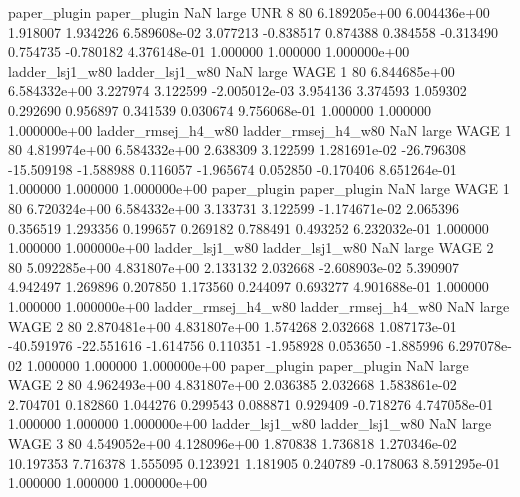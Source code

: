        paper_plugin        paper_plugin                   NaN      large      UNR                 8 80 6.189205e+00   6.004436e+00      1.918007       1.934226  6.589608e-02      3.077213     -0.838517     0.874388       0.384558 -0.313490   0.754735    -0.780182   4.376148e-01            1.000000        1.000000        1.000000e+00
    ladder_lsj1_w80     ladder_lsj1_w80                   NaN      large     WAGE                 1 80 6.844685e+00   6.584332e+00      3.227974       3.122599 -2.005012e-03      3.954136      3.374593     1.059302       0.292690  0.956897   0.341539     0.030674   9.756068e-01            1.000000        1.000000        1.000000e+00
ladder_rmsej_h4_w80 ladder_rmsej_h4_w80                   NaN      large     WAGE                 1 80 4.819974e+00   6.584332e+00      2.638309       3.122599  1.281691e-02    -26.796308    -15.509198    -1.588988       0.116057 -1.965674   0.052850    -0.170406   8.651264e-01            1.000000        1.000000        1.000000e+00
       paper_plugin        paper_plugin                   NaN      large     WAGE                 1 80 6.720324e+00   6.584332e+00      3.133731       3.122599 -1.174671e-02      2.065396      0.356519     1.293356       0.199657  0.269182   0.788491     0.493252   6.232032e-01            1.000000        1.000000        1.000000e+00
    ladder_lsj1_w80     ladder_lsj1_w80                   NaN      large     WAGE                 2 80 5.092285e+00   4.831807e+00      2.133132       2.032668 -2.608903e-02      5.390907      4.942497     1.269896       0.207850  1.173560   0.244097     0.693277   4.901688e-01            1.000000        1.000000        1.000000e+00
ladder_rmsej_h4_w80 ladder_rmsej_h4_w80                   NaN      large     WAGE                 2 80 2.870481e+00   4.831807e+00      1.574268       2.032668  1.087173e-01    -40.591976    -22.551616    -1.614756       0.110351 -1.958928   0.053650    -1.885996   6.297078e-02            1.000000        1.000000        1.000000e+00
       paper_plugin        paper_plugin                   NaN      large     WAGE                 2 80 4.962493e+00   4.831807e+00      2.036385       2.032668  1.583861e-02      2.704701      0.182860     1.044276       0.299543  0.088871   0.929409    -0.718276   4.747058e-01            1.000000        1.000000        1.000000e+00
    ladder_lsj1_w80     ladder_lsj1_w80                   NaN      large     WAGE                 3 80 4.549052e+00   4.128096e+00      1.870838       1.736818  1.270346e-02     10.197353      7.716378     1.555095       0.123921  1.181905   0.240789    -0.178063   8.591295e-01            1.000000        1.000000        1.000000e+00
